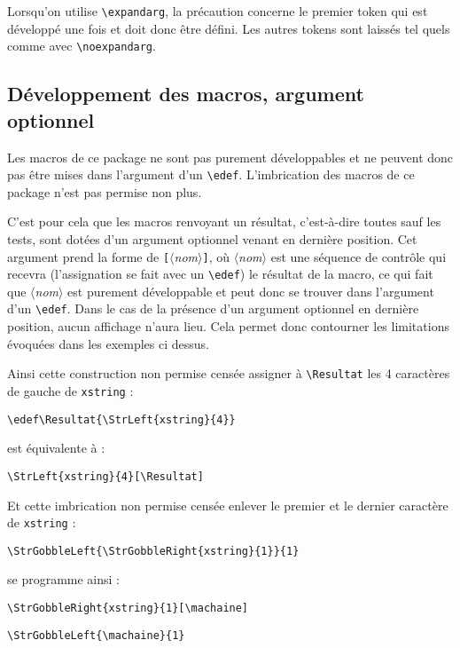 \documentclass[a4paper,10pt,french]{article}
\newcommand\argu[1]{$\langle$\textit{#1}$\rangle$}
\newcommand\arguC[1]{\texttt{\color{black}[}\argu{#1}\texttt{\color{black}]}}
\newcommand\verbinline{\lstinline[basicstyle=\normalsize\ttfamily]}
\begin{document}
Lorsqu'on utilise \verbinline|\expandarg|, la précaution concerne le premier token qui est développé une fois et doit donc être défini. Les autres tokens sont laissés tel quels comme avec \verbinline|\noexpandarg|.

\subsection{Développement des macros, argument optionnel}
\label{argumentoptionnel}
Les macros de ce package ne sont pas purement développables et ne peuvent donc pas être mises dans l'argument d'un \verb|\edef|. L'imbrication des macros de ce package n'est pas permise non plus.\medskip

C'est pour cela que les macros renvoyant un résultat, c'est-à-dire toutes sauf les tests, sont dotées d'un argument optionnel venant en dernière position. Cet argument prend la forme de \arguC{nom}, où \argu{nom} est une séquence de contrôle qui recevra (l'assignation se fait avec un \verb|\edef|) le résultat de la macro, ce qui fait que \argu{nom} est purement développable et peut donc se trouver dans l'argument d'un \verb|\edef|. Dans le cas de la présence d'un argument optionnel en dernière position, aucun affichage n'aura lieu. Cela permet donc contourner les limitations évoquées dans les exemples ci dessus.\medskip

Ainsi cette construction non permise censée assigner à \verb|\Resultat| les 4 caractères de gauche de \verb|xstring| :\par\nobreak
\hspace{0.2\linewidth}\verbinline|\edef\Resultat{\StrLeft{xstring}{4}}|\par\nobreak
\qquad est équivalente à :\par\nobreak
\hspace{0.2\linewidth}\verbinline|\StrLeft{xstring}{4}[\Resultat]|\medskip

Et cette imbrication non permise censée enlever le premier et le dernier caractère de \verb|xstring| :\par\nobreak
\hspace{0.2\linewidth}\verbinline|\StrGobbleLeft{\StrGobbleRight{xstring}{1}}{1}|\par\nobreak
\qquad se programme ainsi :\par\nobreak
\hspace{0.2\linewidth}\verbinline|\StrGobbleRight{xstring}{1}[\machaine]|\par\nobreak
\hspace{0.2\linewidth}\verbinline|\StrGobbleLeft{\machaine}{1}|\par
\end{document}
